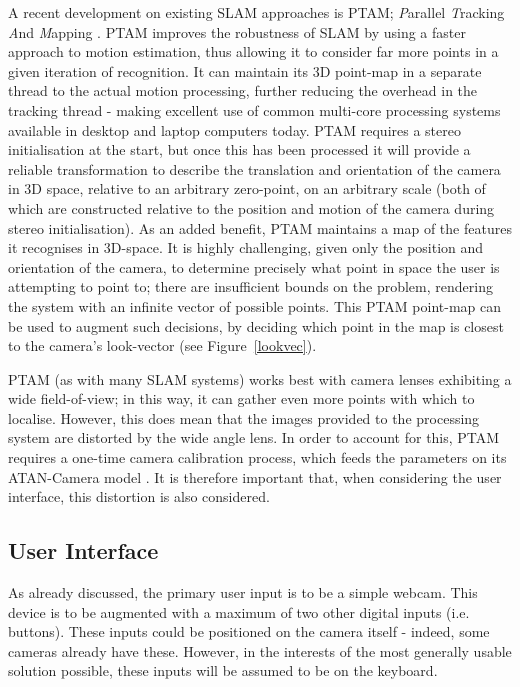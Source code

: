 \documentclass[a4paper,10pt]{article}
\begin{document}
A recent development on existing SLAM approaches is PTAM; \textit{P}arallel \textit{T}racking \textit{A}nd \textit{M}apping \cite{ptam}. PTAM improves the robustness of SLAM by using a faster approach to motion estimation, thus allowing it to consider far more points in a given iteration of recognition. It can maintain its 3D point-map in a separate thread to the actual motion processing, further reducing the overhead in the tracking thread - making excellent use of common multi-core processing systems available in desktop and laptop computers today. PTAM requires a stereo initialisation at the start, but once this has been processed it will provide a reliable transformation to describe the translation and orientation of the camera in 3D space, relative to an arbitrary zero-point, on an arbitrary scale (both of which are constructed relative to the position and motion of the camera during stereo initialisation). As an added benefit, PTAM maintains a map of the features it recognises in 3D-space. It is highly challenging, given only the position and orientation of the camera, to determine precisely what point in space the user is attempting to point to; there are insufficient bounds on the problem, rendering the system with an infinite vector of possible points. This PTAM point-map can be used to augment such decisions, by deciding which point in the map is closest to the camera's look-vector (see Figure~\ref{lookvec}).

PTAM (as with many SLAM systems) works best with camera lenses exhibiting a wide field-of-view; in this way, it can gather even more points with which to localise. However, this does mean that the images provided to the processing system are distorted by the wide angle lens. In order to account for this, PTAM requires a one-time camera calibration process, which feeds the parameters on its ATAN-Camera model \cite{atancam}. It is therefore important that, when considering the user interface, this distortion is also considered.

\subsection{User Interface}
As already discussed, the primary user input is to be a simple webcam. This device is to be augmented with a maximum of two other digital inputs (i.e. buttons). These inputs could be positioned on the camera itself - indeed, some cameras already have these. However, in the interests of the most generally usable solution possible, these inputs will be assumed to be on the keyboard.
\end{document}
